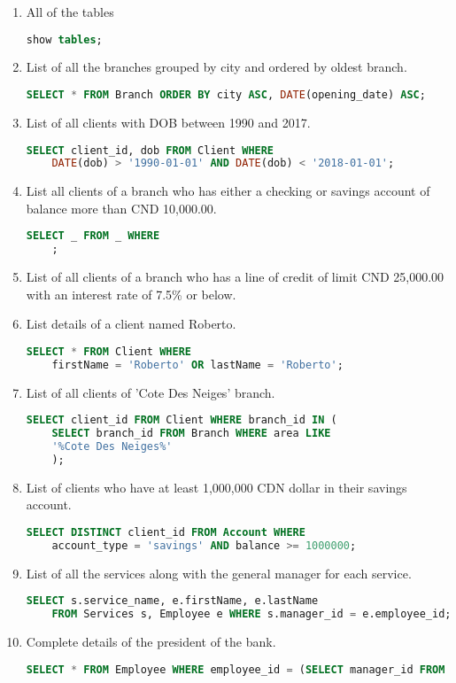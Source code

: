 \documentclass[letterpaper, 12pt]{article}
\begin{document}
\begin{enumerate}[label=(\alph*)]
  \item All of the tables
    \begin{lstlisting}[language=sql]
show tables;
  \end{lstlisting}
  \item List of all the branches grouped by city and ordered by oldest branch.
    \begin{lstlisting}[language=sql]
SELECT * FROM Branch ORDER BY city ASC, DATE(opening_date) ASC;
  \end{lstlisting}
  \item List of all clients with DOB between 1990 and 2017.
    \begin{lstlisting}[language=sql]
SELECT client_id, dob FROM Client WHERE 
	DATE(dob) > '1990-01-01' AND DATE(dob) < '2018-01-01';
  \end{lstlisting}
  \item List all clients of a branch who has either a checking or savings account of balance more than CND 10,000.00.
    \begin{lstlisting}[language=sql]
SELECT _ FROM _ WHERE 
	;
  \end{lstlisting}
  \item List of all clients of a branch who has a line of credit of limit CND 25,000.00 with an interest rate of 7.5\% or below.
  \item List details of a client named Roberto.
    \begin{lstlisting}[language=sql]
SELECT * FROM Client WHERE 
	firstName = 'Roberto' OR lastName = 'Roberto';
  \end{lstlisting}
  \item List of all clients of 'Cote Des Neiges' branch.
    \begin{lstlisting}[language=sql]
SELECT client_id FROM Client WHERE branch_id IN (
	SELECT branch_id FROM Branch WHERE area LIKE
	'%Cote Des Neiges%'
    );
  \end{lstlisting}
  \item List of clients who have at least 1,000,000 CDN dollar in their savings account.
    \begin{lstlisting}[language=sql]
SELECT DISTINCT client_id FROM Account WHERE 
	account_type = 'savings' AND balance >= 1000000;
  \end{lstlisting}
  \item List of all the services along with the general manager for each service.
    \begin{lstlisting}[language=sql]
SELECT s.service_name, e.firstName, e.lastName 
	FROM Services s, Employee e WHERE s.manager_id = e.employee_id;
  \end{lstlisting}
  \item Complete details of the president of the bank.
    \begin{lstlisting}[language=sql]
SELECT * FROM Employee WHERE employee_id = (SELECT manager_id FROM Branch WHERE isHeadOffice = 1);
  \end{lstlisting}

\end{enumerate}
\end{document}

